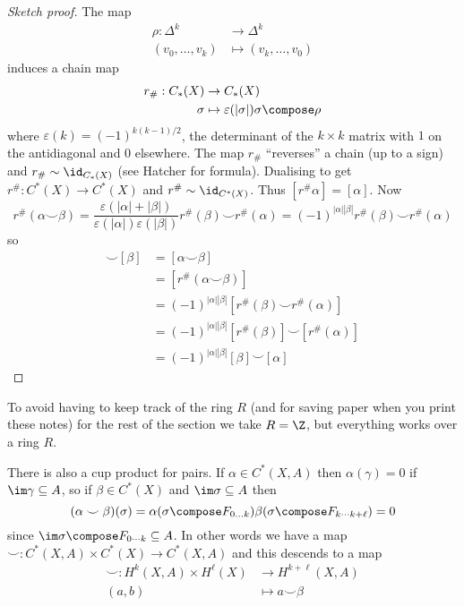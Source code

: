 \documentclass[a4paper]{article}
\newcommand*{\cp}{\smile} %
\begin{document}
\begin{proof}[Sketch proof]
  The map
  \begin{align*}
    \rho: \Delta^k &\to \Delta^k \\
    (v_0,\dots, v_k) &\mapsto (v_k, \dots, v_0)
  \end{align*}
  induces a chain map
  \begin{align*}
    r_\#: C_*(X) &\to C_*(X) \\
    \sigma &\mapsto \varepsilon(|\sigma|) \sigma \compose \rho
  \end{align*}
  where \(\varepsilon(k) = (-1)^{k(k - 1)/2}\), the determinant of the \(k \times k\) matrix with \(1\) on the antidiagonal and \(0\) elsewhere. The map \(r_\#\) ``reverses'' a chain (up to a sign) and \(r_\# \sim \id_{C_*(X)}\) (see Hatcher for formula). Dualising to get \(r^\#: C^*(X) \to C^*(X)\) and \(r^\# \sim \id_{C^*(X)}\). Thus \([r^\# \alpha] = [\alpha]\). Now
  \[
    r^\#(\alpha \cp \beta)
    = \frac{\varepsilon(|\alpha| + |\beta|)}{\varepsilon(|\alpha|) \varepsilon(|\beta|)} r^\#(\beta) \cp r^\#(\alpha)
    = (-1)^{|\alpha||\beta|} r^\#(\beta) \cp r^\#(\alpha)
  \]
  so
  \begin{align*}
    [\alpha] \cp [\beta]
    &= [\alpha \cp \beta] \\
    &= [r^\#(\alpha \cp \beta)] \\
    &= (-1)^{|\alpha||\beta|} [r^\#(\beta) \cp r^\#(\alpha)] \\
    &= (-1)^{|\alpha||\beta|} [r^\#(\beta)] \cp [r^\#(\alpha)] \\
    &= (-1)^{|\alpha||\beta|} [\beta] \cp [\alpha]
  \end{align*}
\end{proof}

To avoid having to keep track of the ring \(R\) (and for saving paper when you print these notes) for the rest of the section we take \(R = \Z\), but everything works over a ring \(R\).

There is also a cup product for pairs. If \(\alpha \in C^*(X, A)\) then \(\alpha(\gamma) = 0\) if \(\im \gamma \subseteq A\), so if \(\beta \in C^*(X)\) and \(\im \sigma \subseteq A\) then
\[
  (\alpha \cp \beta)(\sigma) = \alpha(\sigma \compose F_{0 \dots k}) \beta(\sigma \compose F_{k \cdots k + \ell}) = 0
\]
since \(\im \sigma \compose F_{0 \cdots k} \subseteq A\). In other words we have a map \(\cp: C^*(X, A) \times C^*(X) \to C^*(X, A)\) and this descends to a map
\begin{align*}
  \cp: H^k(X, A) \times H^\ell(X) &\to H^{k + \ell}(X, A) \\
  (a, b) &\mapsto a \cp \beta
\end{align*}
\end{document}
